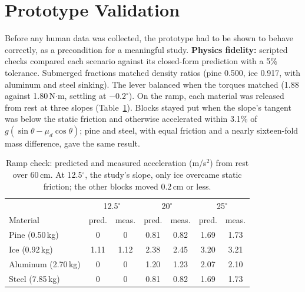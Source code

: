 \documentclass[sigconf,nonacm]{acmart}
\begin{document}
\section{Prototype Validation}
\label{sec:validation}
Before any human data was collected, the prototype had to be shown to behave correctly,
as a precondition for a meaningful study. \textbf{Physics fidelity:} scripted checks
compared each scenario against its closed-form prediction with a 5\% tolerance.
Submerged fractions matched density ratios (pine 0.500, ice 0.917, with aluminum and
steel sinking). The lever balanced when the torques matched (1.88 against 1.80\,N$\cdot$m,
settling at $-0.2^\circ$). On the ramp, each material was released from rest at three
slopes (Table~\ref{tab:ramp}). Blocks stayed put when the slope's tangent was below the
static friction and otherwise accelerated within 3.1\% of $g(\sin\theta -
\mu_d\cos\theta)$; pine and steel, with equal friction and a nearly sixteen-fold mass
difference, gave the same result.

\begin{table}[h]
  \caption{Ramp check: predicted and measured acceleration (m/s$^2$) from rest over
  60\,cm. At 12.5$^\circ$, the study's slope, only ice overcame static friction; the
  other blocks moved 0.2\,cm or less.}
  \label{tab:ramp}
  \begin{tabular}{lcccccc}
    \toprule
    & \multicolumn{2}{c}{12.5$^\circ$} & \multicolumn{2}{c}{20$^\circ$} & \multicolumn{2}{c}{25$^\circ$} \\
    Material & pred. & meas. & pred. & meas. & pred. & meas. \\
    \midrule
    Pine (0.50\,kg)     & 0 & 0 & 0.81 & 0.82 & 1.69 & 1.73 \\
    Ice (0.92\,kg)      & 1.11 & 1.12 & 2.38 & 2.45 & 3.20 & 3.21 \\
    Aluminum (2.70\,kg) & 0 & 0 & 1.20 & 1.23 & 2.07 & 2.10 \\
    Steel (7.85\,kg)    & 0 & 0 & 0.81 & 0.82 & 1.69 & 1.73 \\
    \bottomrule
  \end{tabular}
\end{table}
\end{document}
